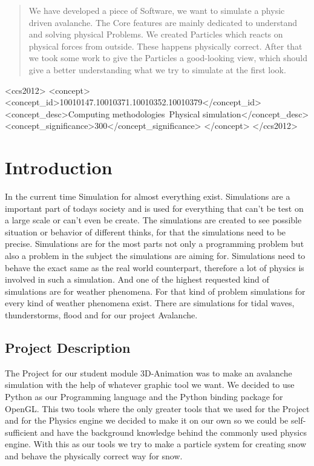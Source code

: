 \documentclass{sig-alternate-05-2015}
\begin{document}
\begin{abstract}
We have developed a piece of Software, we want to simulate a physic driven avalanche. The Core features are mainly dedicated to understand and solving physical Problems. We created Particles which reacts on physical forces from outside. These happens physically correct. After that we took some work to give the Particles a good-looking view, which should give a better understanding what we try to simulate at the first look. \\

\end{abstract}


\begin{CCSXML}
<ccs2012>
<concept>
<concept_id>10010147.10010371.10010352.10010379</concept_id>
<concept_desc>Computing methodologies~Physical simulation</concept_desc>
<concept_significance>300</concept_significance>
</concept>
</ccs2012>
\end{CCSXML}





\section{Introduction}
In the current time Simulation for almost everything exist. Simulations are a important part of todays society and is used for everything that can't be test on a large scale or can't even be create. The simulations are created to see possible situation or behavior of different thinks, for that the simulations need to be precise. Simulations are for the most parts not only a programming problem but also a problem in the subject the simulations are aiming for. Simulations need to behave the exact same as the real world counterpart, therefore a lot of physics is involved in such a simulation. And one of the highest requested kind of simulations are for weather phenomena. For that kind of problem simulations for every kind of weather phenomena exist. There are simulations for tidal waves, thunderstorms, flood and for our project Avalanche.
\subsection{Project Description}
The Project for our student module 3D-Animation was to make an avalanche simulation with the help of whatever graphic tool we want. We decided to use Python as our Programming language and the Python binding package for OpenGL. This two tools where the only greater tools that we used for the Project and for the Physics engine we decided to make it on our own so we could be self-sufficient and have the background knowledge behind the commonly used physics engine. With this as our tools we try to make a particle system for creating snow and behave the physically correct way for snow.
\end{document}
